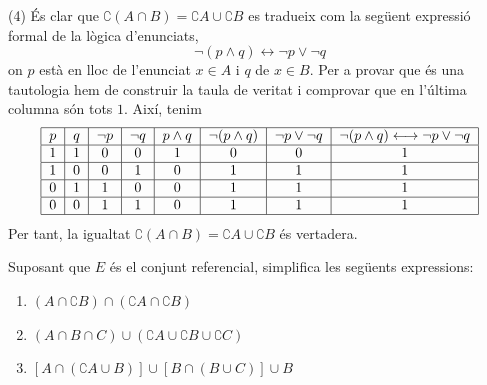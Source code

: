 \begin{solucio}
(4) És clar que $\complement \left( A\cap B\right) =\complement A\cup
\complement B$ es tradueix com la següent expressió formal de la lògica d'enunciats,%
\begin{equation*}
\lnot (p\wedge q)\longleftrightarrow \lnot p\vee \lnot q
\end{equation*}%
on $p$ està en lloc de l'enunciat $x\in A$ i $q$ de $x\in B$. Per a
provar que és una tautologia hem de construir la taula de veritat i
comprovar que en l'última columna són tots $1$. Així, tenim%
\begin{equation*}
\begin{tabular}{|c|c|c|c|c|c|c|c|}
\hline
$p$ & $q$ & $\lnot p$ & $\lnot q$ & $p\wedge q$ & $\lnot (p\wedge q)$ & $%
\lnot p\vee \lnot q$ & $\lnot (p\wedge q)\longleftrightarrow \lnot p\vee
\lnot q$ \\ \hline
$1$ & $1$ & $0$ & $0$ & $1$ & $0$ & $0$ & $1$ \\ \hline
$1$ & $0$ & $0$ & $1$ & $0$ & $1$ & $1$ & $1$ \\ \hline
$0$ & $1$ & $1$ & $0$ & $0$ & $1$ & $1$ & $1$ \\ \hline
$0$ & $0$ & $1$ & $1$ & $0$ & $1$ & $1$ & $1$ \\ \hline
\end{tabular}%
\end{equation*}%
Per tant, la igualtat $\complement \left( A\cap B\right) =\complement A\cup
\complement B$ és vertadera.
\end{solucio}

\begin{exercici}
Suposant que $E$ és el conjunt referencial, simplifica les següents
expressions:

\begin{enumerate}
\item $(A\cap \complement B)\cap (\complement A\cap \complement B)$

\item $(A\cap B\cap C)\cup (\complement A\cup \complement B\cup \complement
C)$

\item $\left[ A\cap (\complement A\cup B)\right] \cup \left[ B\cap (B\cup C)%
\right] \cup B$
\end{enumerate}
\end{exercici}

